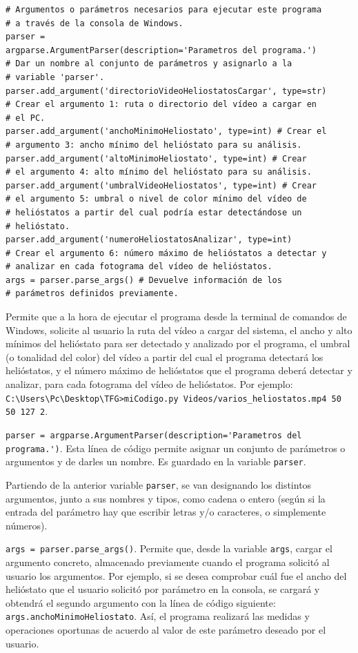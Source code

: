\begin{lstlisting}
# Argumentos o parámetros necesarios para ejecutar este programa
# a través de la consola de Windows.
parser = 
argparse.ArgumentParser(description='Parametros del programa.')
# Dar un nombre al conjunto de parámetros y asignarlo a la
# variable 'parser'.
parser.add_argument('directorioVideoHeliostatosCargar', type=str)
# Crear el argumento 1: ruta o directorio del vídeo a cargar en
# el PC.
parser.add_argument('anchoMinimoHeliostato', type=int) # Crear el 
# argumento 3: ancho mínimo del helióstato para su análisis.
parser.add_argument('altoMinimoHeliostato', type=int) # Crear
# el argumento 4: alto mínimo del helióstato para su análisis.
parser.add_argument('umbralVideoHeliostatos', type=int) # Crear
# el argumento 5: umbral o nivel de color mínimo del vídeo de
# helióstatos a partir del cual podría estar detectándose un
# helióstato.
parser.add_argument('numeroHeliostatosAnalizar', type=int)
# Crear el argumento 6: número máximo de helióstatos a detectar y
# analizar en cada fotograma del vídeo de helióstatos.
args = parser.parse_args() # Devuelve información de los
# parámetros definidos previamente.
\end{lstlisting}

Permite que a la hora de ejecutar el programa desde la terminal de comandos de Windows, solicite al usuario la ruta del vídeo a cargar del sistema, el ancho y alto mínimos del helióstato para ser detectado y analizado por el programa, el umbral (o tonalidad del color) del vídeo a partir del cual el programa detectará los helióstatos, y el número máximo de helióstatos que el programa deberá detectar y analizar, para cada fotograma del vídeo de helióstatos. Por ejemplo: \verb|C:\Users\Pc\Desktop\TFG>miCodigo.py Videos/varios_heliostatos.mp4 50 50 127 2|.

\verb|parser = argparse.ArgumentParser(description='Parametros del programa.')|. Esta línea de código permite asignar un conjunto de parámetros o argumentos y de darles un nombre. Es guardado en la variable \verb|parser|.

Partiendo de la anterior variable \verb|parser|, se van designando los distintos argumentos, junto a sus nombres y tipos, como cadena o entero (según si la entrada del parámetro hay que escribir letras y/o caracteres, o simplemente números).

\verb|args = parser.parse_args()|. Permite que, desde la variable \verb|args|, cargar el argumento concreto, almacenado previamente cuando el programa solicitó al usuario los argumentos. Por ejemplo, si se desea comprobar cuál fue el ancho del helióstato que el usuario solicitó por parámetro en la consola, se cargará y obtendrá el segundo argumento con la línea de código siguiente: \verb|args.anchoMinimoHeliostato|. Así, el programa realizará las medidas y operaciones oportunas de acuerdo al valor de este parámetro deseado por el usuario.\\[20pt]

